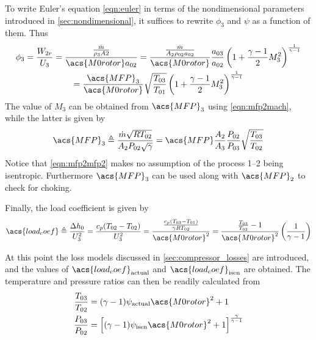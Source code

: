 To write Euler's equation \cref{eqn:euler} in terms of the nondimensional parameters introduced in \cref{sec:nondimensional}, it suffices to rewrite $\phi_3$ and $\psi$ as a function of them. Thus
\begin{multline}
    \label{eqn:phi2_dimensionless}
    \phi_3 = \frac{W_{2r}}{U_3} 
           = \frac{\frac{\dot{m}}{\rho_3 A2}}{\acs{M0rotor} a_{02}}
           = \frac{\MFPalt{2}}{\acs{M0rotor}} \frac{a_{03}}{a_{02}} \stagdensratio{3} \\ 
           = \frac{\acs{MFP}_3}{\acs{M0rotor}} \sqrt{\frac{T_{03}}{T_{01}}} \stagdensratio{3}
\end{multline}
The value of $M_3$ can be obtained from $\acs{MFP}_3$ using \cref{eqn:mfp2mach}, while the latter is given by
\begin{equation}
    \label{eqn:mfp2mfp2}
    \acs{MFP}_3 \triangleq \MFP{2} = \acs{MFP} \frac{A_2}{A_3} \frac{P_{02}}{P_{03}} \sqrt{\frac{T_{03}}{T_{02}}}
\end{equation}
Notice that \cref{eqn:mfp2mfp2} makes no assumption of the process 1--2 being isentropic. Furthermore $\acs{MFP}_3$ can be used along with $\acs{MFP}_2$ to check for choking.

Finally, the load coefficient is given by
\begin{equation}
    \acs{load_coef}\triangleq \frac{\Delta h_0}{U_3^2}
                      = \frac{c_p(T_{02}-T_{02})}{U_3^2}
                      = \frac{\frac{c_p(T_{03}-T_{01})}{\gamma R T_{02}}}
                                    {\acs{M0rotor}^2}
                      = \frac{\frac{T_{03}}{T_{02}}-1}
                                  {\acs{M0rotor}^2}
                        \left(\frac{1}{\gamma-1}\right)
\end{equation}

At this point the loss models discussed in \cref{sec:compressor_losses} are introduced, 
and the values of $\acs{load_coef}_{\text{actual}}$ and $\acs{load_coef}_{\text{isen}}$ are obtained.
The temperature and pressure ratios can then be readily calculated from
\begin{align}
    \label{eqn:psi2Tratio}
    \frac{T_{03}}{T_{02}} &= (\gamma - 1)\psi_{\text{actual}} \acs{M0rotor}^2 + 1 \\
    \label{eqn:psi2Pratio}
    \frac{P_{03}}{P_{02}} &= \left[(\gamma - 1)\psi_{\text{isen}} \acs{M0rotor}^2 + 1\right]^\frac{\gamma}{\gamma-1}
\end{align}

